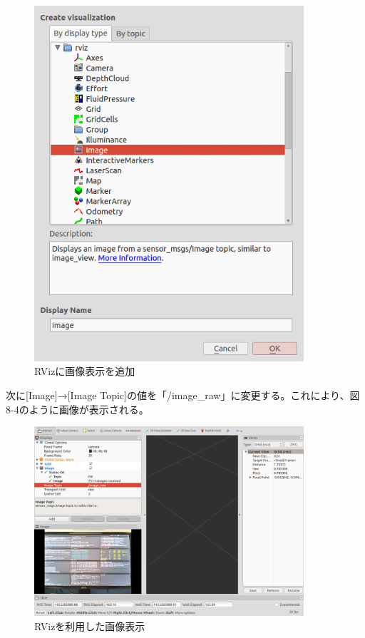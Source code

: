 \begin{figure}[htp]
  \centering
  \includegraphics[width=10cm]{pictures/chapter8/pic_08_03.png}
  \caption{RVizに画像表示を追加}
\end{figure}

次に[Image]→[Image Topic]の値を「/image\_raw」に変更する。これにより、図8-4のように画像が表示される。

\begin{figure}[htp]
  \centering
  \includegraphics[width=10cm]{pictures/chapter8/pic_08_04.png}
  \caption{RVizを利用した画像表示}
\end{figure}

